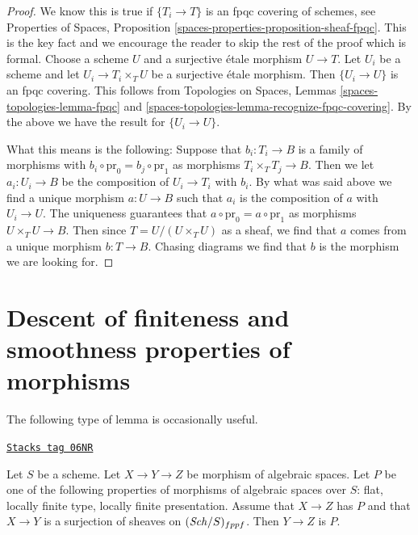 \begin{proof}
We know this is true if $\{T_i \to T\}$ is an fpqc covering of
schemes, see Properties of Spaces, Proposition
\ref{spaces-properties-proposition-sheaf-fpqc}.
This is the key fact and we encourage the reader to skip the rest
of the proof which is formal. Choose a scheme $U$ and a surjective
\'etale morphism
$U \to T$. Let $U_i$ be a scheme and let $U_i \to T_i \times_T U$
be a surjective \'etale morphism. Then $\{U_i \to U\}$ is an
fpqc covering. This follows from
Topologies on Spaces, Lemmas \ref{spaces-topologies-lemma-fpqc} and
\ref{spaces-topologies-lemma-recognize-fpqc-covering}.
By the above we have the result for $\{U_i \to U\}$.

\medskip\noindent
What this means is the following: Suppose that $b_i : T_i \to B$
is a family of morphisms with
$b_i \circ \text{pr}_0 = b_j \circ \text{pr}_1$ as morphisms
$T_i \times_T T_j \to B$. Then we let $a_i : U_i \to B$ be the
composition of $U_i \to T_i$ with $b_i$. By what was said above
we find a unique morphism $a : U \to B$ such that
$a_i$ is the composition of $a$ with $U_i \to U$.
The uniqueness guarantees that $a \circ \text{pr}_0 = a \circ \text{pr}_1$
as morphisms $U \times_T U \to B$. Then since $T = U/(U \times_T U)$
as a sheaf, we find that $a$ comes from a unique morphism $b : T \to B$.
Chasing diagrams we find that $b$ is the morphism we are looking for.
\end{proof}

\section{Descent of finiteness and smoothness properties of morphisms}
\label{spaces-descent-section-descent-finiteness-morphisms}
The following type of lemma is occasionally useful.

\begin{lemma}[Curiosity]
\label{spaces-descent-lemma-curiosity}
\href{https://stacks.math.columbia.edu/tag/06NR}{\texttt{Stacks tag 06NR}}

Let $S$ be a scheme. Let $X \to Y \to Z$ be morphism of algebraic spaces.
Let $P$ be one of the following properties of morphisms of algebraic spaces
over $S$:
flat, locally finite type, locally finite presentation.
Assume that $X \to Z$ has $P$ and that
$X \to Y$ is a surjection of sheaves on $(\mathit{Sch}/S)_{fppf}$.
Then $Y \to Z$ is $P$.
\end{lemma}

